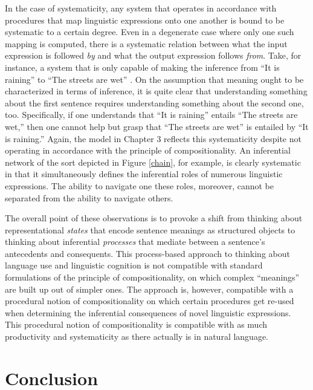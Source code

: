 In the case of systematicity, any system that operates in accordance with procedures that map linguistic expressions onto one another is bound to be systematic to a certain degree. Even in a degenerate case where only one such mapping is computed, there is a systematic relation between what the input expression is followed \textit{by} and what the output expression follows \textit{from}. Take, for instance, a system that is only capable of making the inference from ``It is raining'' to ``The streets are wet'' \citep[][p. 313]{Sellars:1953}. On the assumption that meaning ought to be characterized in terms of inference, it is quite clear that understanding something about the first sentence requires understanding something about the second one, too. Specifically, if one understands that ``It is raining'' entails ``The streets are wet,'' then one cannot help but grasp that ``The streets are wet'' is entailed by ``It is raining.'' Again, the model in Chapter 3 reflects this systematicity despite not operating in accordance with the principle of compositionality. An inferential network of the sort depicted in Figure \ref{chain}, for example, is clearly systematic in that it simultaneously defines the inferential roles of numerous linguistic expressions. The ability to navigate one these roles, moreover, cannot be separated from the ability to navigate others. 

The overall point of these observations is to provoke a shift from thinking about representational \textit{states} that encode sentence meanings as structured objects to thinking about inferential \textit{processes} that mediate between a sentence's antecedents and consequents. This process-based approach to thinking about language use and linguistic cognition is not compatible with standard formulations of the principle of compositionality, on which complex ``meanings'' are built up out of simpler ones. The approach is, however, compatible with a procedural notion of compositionality on which certain procedures get re-used when determining the inferential consequences of novel linguistic expressions. This procedural notion of compositionality is compatible with as much productivity and systematicity as there actually is in natural language. 

\section{Conclusion}

